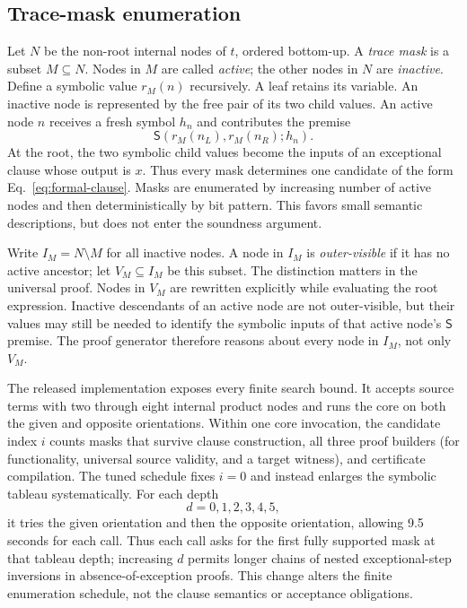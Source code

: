\documentclass[runningheads]{llncs}
\newcommand{\Step}{\mathsf{S}}
\begin{document}
\subsection{Trace-mask enumeration}

Let $N$ be the non-root internal nodes of $t$, ordered bottom-up.  A
\emph{trace mask} is a subset $M\subseteq N$.  Nodes in $M$ are called
\emph{active}; the other nodes in $N$ are \emph{inactive}.  Define a symbolic
value $r_M(n)$ recursively.  A leaf retains its variable.  An inactive node is
represented by the free pair of its two child values.  An active node $n$
receives a fresh symbol $h_n$ and contributes the premise
\[
 \Step(r_M(n_L),r_M(n_R);h_n).
\]
At the root, the two symbolic child values become the inputs of an exceptional
clause whose output is $x$.  Thus every mask determines one candidate of the form
Eq.~\eqref{eq:formal-clause}.  Masks are enumerated by increasing number of active
nodes and then deterministically by bit pattern.  This favors small semantic
descriptions, but does not enter the soundness argument.

Write $I_M=N\setminus M$ for all inactive nodes.  A node in $I_M$ is
\emph{outer-visible} if it has no active ancestor; let $V_M\subseteq I_M$ be
this subset.  The distinction matters in the universal proof.  Nodes in $V_M$
are rewritten explicitly while evaluating the root expression.  Inactive
descendants of an active node are not outer-visible, but their values may still
be needed to identify the symbolic inputs of that active node's $\Step$
premise.  The proof generator therefore reasons about every node in $I_M$, not
only $V_M$.

The released implementation exposes every finite search bound.  It accepts
source terms with two through eight internal product nodes and runs the core on
both the given and opposite orientations.  Within one core invocation, the
candidate index $i$ counts masks that survive clause construction, all three
proof builders (for functionality, universal source validity, and a target
witness), and certificate compilation.  The tuned schedule fixes $i=0$ and
instead enlarges the symbolic tableau systematically.  For each depth
\[
 d=0,1,2,3,4,5,
\]
it tries the given orientation and then the opposite orientation, allowing
9.5 seconds for each call.  Thus each call asks for the first fully supported
mask at that tableau depth; increasing $d$ permits longer chains of nested
exceptional-step inversions in absence-of-exception proofs.  This change
alters the finite enumeration schedule, not the clause semantics or acceptance
obligations.
\end{document}
